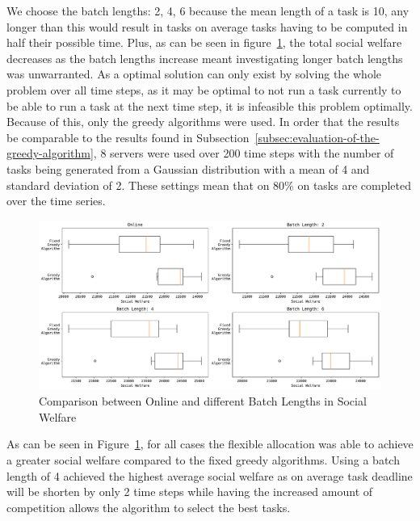 We choose the batch lengths: 2, 4, 6 because the mean length of a task is 10, any longer than this would result in
tasks on average tasks having to be computed in half their possible time. Plus, as can be seen in
figure~\ref{fig:batch-task-allocation}, the total social welfare decreases as the batch lengths increase meant
investigating longer batch lengths was unwarranted. As a optimal solution can only exist by solving the whole problem
over all time steps, as it may be optimal to not run a task currently to be able to run a task at the next time step,
it is infeasible this problem optimally. Because of this, only the greedy algorithms were used. In order that the
results be comparable to the results found in Subsection~\ref{subsec:evaluation-of-the-greedy-algorithm}, 8 servers
were used over 200 time steps with the number of tasks being generated from a Gaussian distribution with a mean of 4
and standard deviation of 2. These settings mean that on 80\% on tasks are completed over the time series.

\begin{figure}[h]
    \centering
    \includegraphics[width=\linewidth]{figs/online/online_batch_lengths.pdf}
    \caption{Comparison between Online and different Batch Lengths in Social Welfare}
    \label{fig:batch-task-allocation}
\end{figure}

As can be seen in Figure~\ref{fig:batch-task-allocation}, for all cases the flexible allocation was able
to achieve a greater social welfare compared to the fixed greedy algorithms. Using a batch length of
4 achieved the highest average social welfare as on average task deadline will be shorten by only
2 time steps while having the increased amount of competition allows the algorithm to select the best
tasks.